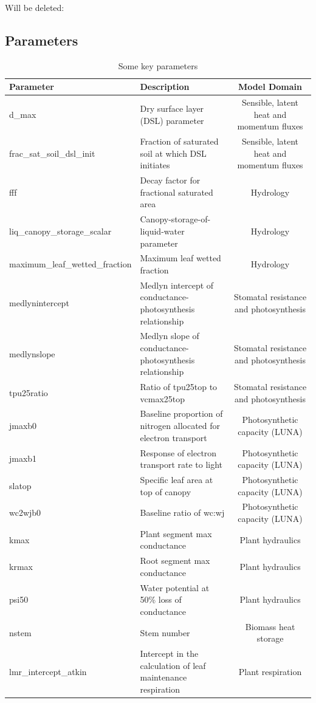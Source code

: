 \documentclass[draft]{agujournal2019}
\begin{document}
Will be deleted:
\subsection{Parameters} 
\begin{landscape}
 \begin{table}[h]
 \caption{Some key parameters}
 \centering
 \begin{tabular}{l l c}
 \hline
  Parameter  & Description & Model Domain \\
 \hline
d\_max & Dry surface layer (DSL) parameter & Sensible, latent heat and momentum fluxes \\
frac\_sat\_soil\_dsl\_init & Fraction of saturated soil at which DSL initiates & Sensible, latent heat and momentum fluxes \\
fff & Decay factor for fractional saturated area & Hydrology \\
liq\_canopy\_storage\_scalar & Canopy-storage-of-liquid-water parameter & Hydrology \\
maximum\_leaf\_wetted\_fraction & Maximum leaf wetted fraction & Hydrology \\
medlynintercept & Medlyn intercept of conductance-photosynthesis relationship & Stomatal resistance and photosynthesis \\
medlynslope & Medlyn slope of conductance-photosynthesis relationship & Stomatal resistance and photosynthesis \\
tpu25ratio & Ratio of tpu25top to vcmax25top & Stomatal resistance and photosynthesis \\
jmaxb0 & Baseline proportion of nitrogen allocated for electron transport & Photosynthetic capacity (LUNA) \\
jmaxb1 & Response of electron transport rate to light & Photosynthetic capacity (LUNA) \\
slatop & Specific leaf area at top of canopy & Photosynthetic capacity (LUNA) \\
wc2wjb0 & Baseline ratio of wc:wj & Photosynthetic capacity (LUNA) \\
kmax & Plant segment max conductance & Plant hydraulics \\
krmax & Root segment max conductance & Plant hydraulics \\
psi50 & Water potential at 50\% loss of conductance & Plant hydraulics \\
nstem & Stem number & Biomass heat storage \\
lmr\_intercept\_atkin & Intercept in the calculation of leaf maintenance respiration& Plant respiration \\

\end{tabular}
\end{table}
\end{landscape}
\end{document}

